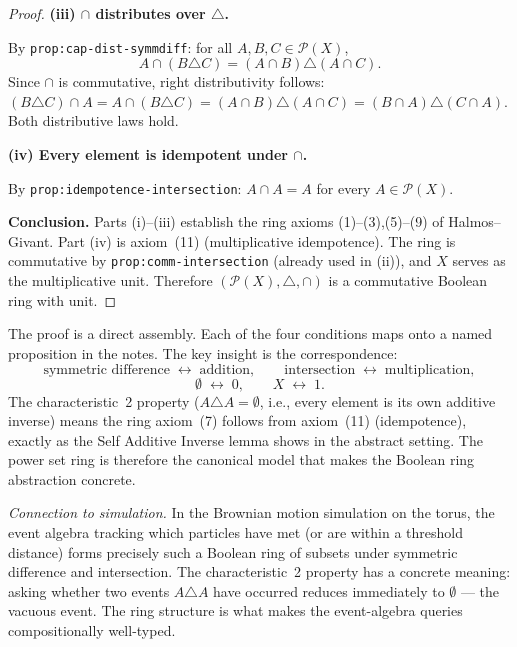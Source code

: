 \begin{proof}
\medskip
\noindent\textbf{(iii) $\cap$ distributes over $\triangle$.}

By \texttt{prop:cap-dist-symmdiff}: for all $A, B, C \in \mathcal{P}(X)$,
\[
A \cap (B \triangle C) = (A \cap B) \triangle (A \cap C).
\]
Since $\cap$ is commutative, right distributivity follows:
$(B \triangle C) \cap A = A \cap (B \triangle C) = (A \cap B) \triangle
(A \cap C) = (B \cap A) \triangle (C \cap A)$. Both distributive laws hold.

\medskip
\noindent\textbf{(iv) Every element is idempotent under $\cap$.}

By \texttt{prop:idempotence-intersection}: $A \cap A = A$ for every
$A \in \mathcal{P}(X)$.

\medskip
\noindent\textbf{Conclusion.} Parts (i)--(iii) establish the ring axioms
(1)--(3),(5)--(9) of Halmos--Givant. Part (iv) is axiom~(11) (multiplicative
idempotence). The ring is commutative by \texttt{prop:comm-intersection}
(already used in (ii)), and $X$ serves as the multiplicative unit. Therefore
$(\mathcal{P}(X), \triangle, \cap)$ is a commutative Boolean ring with unit.
\end{proof}

\begin{remark*}
The proof is a direct assembly. Each of the four conditions maps onto
a named proposition in the notes. The key insight is the correspondence:
\[
\text{symmetric difference} \;\longleftrightarrow\; \text{addition},
\qquad
\text{intersection} \;\longleftrightarrow\; \text{multiplication},
\]
\[
\emptyset \;\longleftrightarrow\; 0,
\qquad
X \;\longleftrightarrow\; 1.
\]
The characteristic~2 property ($A \triangle A = \emptyset$, i.e., every
element is its own additive inverse) means the ring axiom~(7) follows from
axiom~(11) (idempotence), exactly as the Self Additive Inverse lemma shows
in the abstract setting. The power set ring is therefore the canonical
model that makes the Boolean ring abstraction concrete.

\smallskip
\noindent\textit{Connection to simulation.} In the Brownian motion
simulation on the torus, the event algebra tracking which particles have
met (or are within a threshold distance) forms precisely such a Boolean
ring of subsets under symmetric difference and intersection. The
characteristic~2 property has a concrete meaning: asking whether two
events $A \triangle A$ have occurred reduces immediately to $\emptyset$
--- the vacuous event. The ring structure is what makes the event-algebra
queries compositionally well-typed.
\end{remark*}

